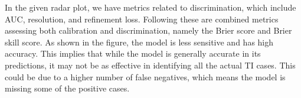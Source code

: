 In the given radar plot, we have metrics related to discrimination, which include AUC, resolution, and refinement loss. Following these are combined metrics assessing both calibration and discrimination, namely the Brier score and Brier skill score. As shown in the figure, the model is less sensitive and has high accuracy. This implies that while the model is generally accurate in its predictions, it may not be as effective in identifying all the actual TI cases. This could be due to a higher number of false negatives, which means the model is missing some of the positive cases.

\endgroup